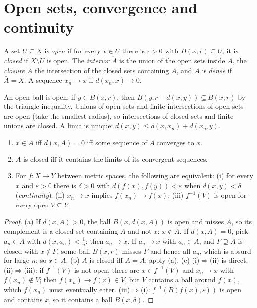 \section{Open sets, convergence and continuity}

\begin{definition}
A set $U\subseteq X$ is \emph{open} if for every $x\in U$ there is $r>0$ with $B(x,r)\subseteq U$; it is \emph{closed} if $X\setminus U$ is open. The
\emph{interior} $\mathring A$ is the union of the open sets inside $A$, the \emph{closure} $\bar A$ the intersection of the closed sets containing $A$,
and $A$ is \emph{dense} if $\bar A=X$. A sequence $x_n\to x$ if $d(x_n,x)\to0$.
\end{definition}

An open ball is open: if $y\in B(x,r)$, then $B(y,r-d(x,y))\subseteq B(x,r)$ by the triangle inequality. Unions of open sets and finite
intersections of open sets are open (take the smallest radius), so intersections of closed sets and finite unions are
closed. A limit is unique: $d(x,y)\le d(x,x_n)+d(x_n,y)$.

\begin{proposition}\label{prop:closure}
\begin{enumerate}[label=(\alph*)]
\item $x\in\bar A$ iff $d(x,A)=0$ iff some sequence of $A$ converges to $x$.
\item $A$ is closed iff it contains the limits of its convergent sequences.
\item For $f:X\to Y$ between metric spaces, the following are equivalent: (i) for every $x$ and $\varepsilon>0$ there is $\delta>0$ with
$d(f(x),f(y))<\varepsilon$ when $d(x,y)<\delta$ (\emph{continuity}); (ii) $x_n\to x$ implies $f(x_n)\to f(x)$; (iii) $f^{-1}(V)$ is open for every
open $V\subseteq Y$.
\end{enumerate}
\end{proposition}
\begin{proof}
(a) If $d(x,A)>0$, the ball $B(x,d(x,A))$ is open and misses $A$, so its complement is a closed set containing $A$ and not $x$: $x\notin\bar A$.
If $d(x,A)=0$, pick $a_n\in A$ with $d(x,a_n)<\frac1n$: then $a_n\to x$. If $a_n\to x$ with $a_n\in A$, and $F\supseteq A$ is closed with $x\notin F$, some ball
$B(x,r)$ misses $F$ and hence all $a_n$, which is absurd for large $n$; so $x\in\bar A$. (b) $A$ is closed iff $A=\bar A$; apply (a).
(c) (i)$\Rightarrow$(ii) is direct. (ii)$\Rightarrow$(iii): if $f^{-1}(V)$ is not open, there are $x\in f^{-1}(V)$ and $x_n\to x$ with $f(x_n)\notin V$; then
$f(x_n)\to f(x)\in V$, but $V$ contains a ball around $f(x)$, which $f(x_n)$ must eventually enter. (iii)$\Rightarrow$(i): $f^{-1}(B(f(x),\varepsilon))$ is open and
contains $x$, so it contains a ball $B(x,\delta)$.
\end{proof}

